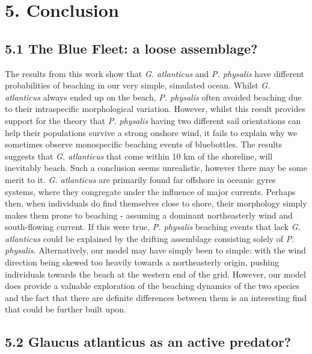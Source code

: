 \documentclass[
]{article}
\begin{document}
\hypertarget{conclusion}{%
\section{5. Conclusion}\label{conclusion}}

\hypertarget{the-blue-fleet-a-loose-assemblage}{%
\subsection{5.1 The Blue Fleet: a loose
assemblage?}\label{the-blue-fleet-a-loose-assemblage}}

The results from this work show that \emph{G. atlanticus} and \emph{P.
physalis} have different probabilities of beaching in our very simple,
simulated ocean. Whilst \emph{G. atlanticus} always ended up on the
beach, \emph{P. physalis} often avoided beaching due to their
intraspecific morphological variation. However, whilst this result
provides support for the theory that \emph{P. physalis} having two
different sail orientations can help their populations survive a strong
onshore wind, it fails to explain why we sometimes observe monospecific
beaching events of bluebottles. The results suggests that \emph{G.
atlanticus} that come within 10 km of the shoreline, will inevitably
beach. Such a conclusion seems unrealistic, however there may be some
merit to it. \emph{G. atlanticus} are primarily found far offshore in
oceanic gyres systems, where they congregate under the influence of
major currents. Perhaps then, when individuals do find themselves close
to shore, their morphology simply makes them prone to beaching -
assuming a dominant northeasterly wind and south-flowing current. If
this were true, \emph{P. physalis} beaching events that lack \emph{G.
atlanticus} could be explained by the drifting assemblage consisting
solely of \emph{P. physalis}. Alternatively, our model may have simply
been to simple: with the wind direction being skewed too heavily towards
a northeasterly origin, pushing individuals towards the beach at the
western end of the grid. However, our model does provide a valuable
exploration of the beaching dynamics of the two species and the fact
that there are definite differences between them is an interesting find
that could be further built upon.

\hypertarget{glaucus-atlanticus-as-an-active-predator}{%
\subsection{5.2 Glaucus atlanticus as an active
predator?}\label{glaucus-atlanticus-as-an-active-predator}}
\end{document}
